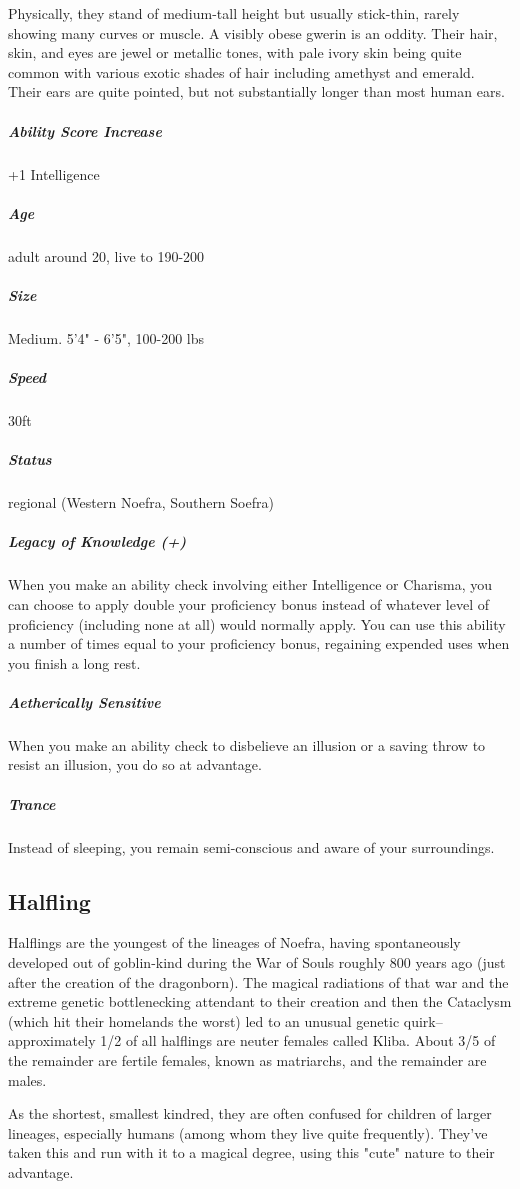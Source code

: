Physically, they stand of medium-tall height but usually stick-thin, rarely showing many curves or muscle. A visibly obese gwerin is an oddity. Their hair, skin, and eyes are jewel or metallic tones, with pale ivory skin being quite common with various exotic shades of hair including amethyst and emerald. Their ears are quite pointed, but not substantially longer than most human ears.

\subparagraph*{Ability Score Increase}  +1 Intelligence

\subparagraph*{Age}  adult around 20, live to 190-200

\subparagraph*{Size}  Medium. 5'4" - 6'5", 100-200 lbs

\subparagraph*{Speed}  30ft

\subparagraph*{Status}  regional (Western Noefra, Southern Soefra)

\subparagraph*{Legacy of Knowledge (+)}  When you make an ability check involving either Intelligence or Charisma, you can choose to apply double your proficiency bonus instead of whatever level of proficiency (including none at all) would normally apply. You can use this ability a number of times equal to your proficiency bonus, regaining expended uses when you finish a long rest.

\subparagraph*{Aetherically Sensitive}  When you make an ability check to disbelieve an illusion or a saving throw to resist an illusion, you do so at advantage.

\subparagraph*{Trance}  Instead of sleeping, you remain semi-conscious and aware of your surroundings.

\subsection{Halfling}\label{lineage:halfling}

Halflings are the youngest of the lineages of Noefra, having spontaneously developed out of goblin-kind during the War of Souls roughly 800 years ago (just after the creation of the dragonborn). The magical radiations of that war and the extreme genetic bottlenecking attendant to their creation and then the Cataclysm (which hit their homelands the worst) led to an unusual genetic quirk--approximately 1/2 of all halflings are neuter females called Kliba. About 3/5 of the remainder are fertile females, known as matriarchs, and the remainder are males.

As the shortest, smallest kindred, they are often confused for children of larger lineages, especially humans (among whom they live quite frequently). They've taken this and run with it to a magical degree, using this "cute" nature to their advantage.

